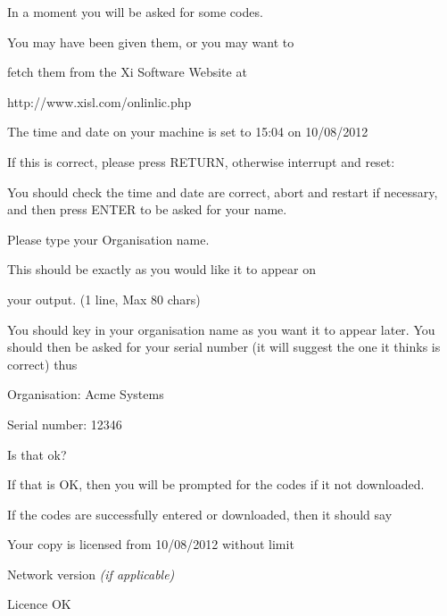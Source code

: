 {\begin{expara}

In a moment you will be asked for some codes.

\bigskip

You may have been given them, or you may want to

fetch them from the Xi Software Website at

http://www.xisl.com/onlinlic.php

\bigskip

The time and date on your machine is set to 15:04 on 10/08/2012

If this is correct, please press RETURN, otherwise interrupt and reset:

\end{expara}

You should check the time and date are correct, abort and restart if
necessary, and then press ENTER to be asked for your name.

\begin{expara}

Please type your Organisation name.

This should be exactly as you would like it to appear on

your output. (1 line, Max 80 chars)

\end{expara}

You should key in your organisation name as you want it to appear later.
You should then be asked for your serial number (it will suggest the
one it thinks is correct) thus

\begin{expara}

Organisation: Acme Systems

Serial number: 12346

\bigskip

Is that ok?

\end{expara}

If that is OK, then you will be prompted for the codes if it not
downloaded.

If the codes are successfully entered or downloaded, then it should say

\begin{expara}

Your copy is licensed from 10/08/2012 without limit

Network version \textit{(if applicable)}

Licence OK


\end{expara}}
